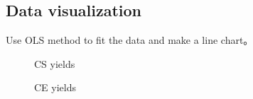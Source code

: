 \documentclass{swmcmthesis}
\begin{document}
\subsection{Data visualization}

Use OLS method to fit the data and make a line chart。

\begin{figure}[h!t]
    \centering
    \hfill
    \caption{CS yields}
\end{figure}

\begin{figure}[h!t]
    \centering
    \hfill
    \caption{CE yields}
\end{figure}
\end{document}
